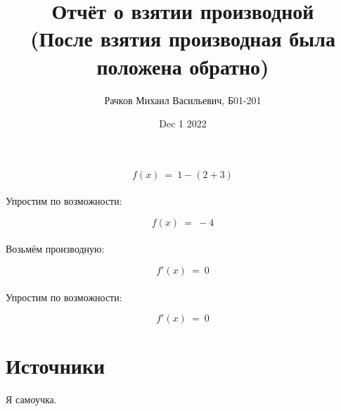 \documentclass[a4paper, 12pt]{article}
\author{Рачков Михаил Васильевич, Б01-201}
\date{Dec  1 2022}
\title{\textbf{Отчёт о взятии производной} \\(После взятия производная была положена обратно)}
\begin{document}
        \maketitle 
            \maketitle
            \begin{equation}
            f(x)~=~1 - (2 + 3)
    \end{equation}
    \\ Упростим по возможности: \\
            \maketitle
            \begin{equation}
            f(x)~=~-4
    \end{equation}
    \\ Возьмём производную: \\
            \maketitle
            \begin{equation}
            f'(x)~=~0
    \end{equation}
    \\ Упростим по возможности: \\
            \maketitle
            \begin{equation}
            f'(x)~=~0
    \end{equation}
    
    \section{Источники}
    Я самоучка.
    
    
\end{document}
